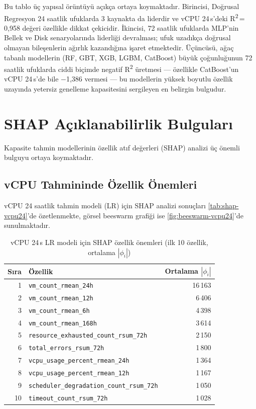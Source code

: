 Bu tablo üç yapısal örüntüyü açıkça ortaya koymaktadır.
Birincisi, Doğrusal Regresyon 24 saatlik ufuklarda 3 kaynakta da liderdir ve vCPU 24\,s'deki R\textsuperscript{2}\,=\,0{,}958 değeri özellikle dikkat çekicidir.
İkincisi, 72 saatlik ufuklarda MLP'nin Bellek ve Disk senaryolarında liderliği devralması; ufuk uzadıkça doğrusal olmayan bileşenlerin ağırlık kazandığına işaret etmektedir.
Üçüncüsü, ağaç tabanlı modellerin (RF, GBT, XGB, LGBM, CatBoost) büyük çoğunluğunun 72 saatlik ufuklarda ciddi biçimde negatif R\textsuperscript{2} üretmesi — özellikle CatBoost'un vCPU 24\,s'de bile $-$1{,}386 vermesi — bu modellerin yüksek boyutlu özellik uzayında yetersiz genelleme kapasitesini sergileyen en belirgin bulgudur.


\section{SHAP Açıklanabilirlik Bulguları}
\label{sec:bulgu-shap}

Kapasite tahmin modellerinin özellik atıf değerleri (SHAP) analizi üç önemli bulguyu ortaya koymaktadır.

\subsection{vCPU Tahmininde Özellik Önemleri}

vCPU 24 saatlik tahmin modeli (LR) için SHAP analizi sonuçları \autoref{tab:shap-vcpu24}'de özetlenmekte, görsel beeswarm grafiği ise \autoref{fig:beeswarm-vcpu24}'de sunulmaktadır.

\begin{table}[htbp]
    \centering
    \caption{vCPU 24\,s LR modeli için SHAP özellik önemleri (ilk 10 özellik, ortalama $|\phi_i|$)}
    \label{tab:shap-vcpu24}
    \begin{tabular}{rlr}
        \textbf{Sıra} & \textbf{Özellik} & \textbf{Ortalama $|\phi_i|$} \\
        \hline
        1  & \texttt{vm\_count\_rmean\_24h}                        & 16\,163 \\
        2  & \texttt{vm\_count\_rmean\_12h}                        &  6\,406 \\
        3  & \texttt{vm\_count\_rmean\_6h}                         &  4\,398 \\
        4  & \texttt{vm\_count\_rmean\_168h}                       &  3\,614 \\
        5  & \texttt{resource\_exhausted\_count\_rsum\_72h}        &  2\,150 \\
        6  & \texttt{total\_errors\_rsum\_72h}                     &  1\,800 \\
        7  & \texttt{vcpu\_usage\_percent\_rmean\_24h}             &  1\,364 \\
        8  & \texttt{vcpu\_usage\_percent\_rmean\_12h}             &  1\,167 \\
        9  & \texttt{scheduler\_degradation\_count\_rsum\_72h}     &  1\,050 \\
        10 & \texttt{timeout\_count\_rsum\_72h}                    &  1\,028 \\
    \end{tabular}
\end{table}

